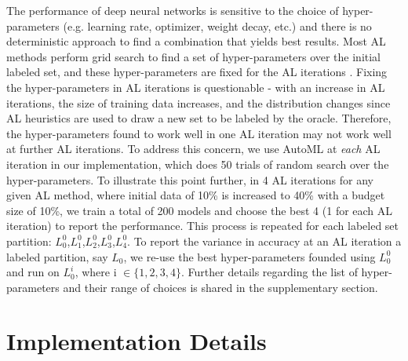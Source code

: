 \documentclass[10pt,twocolumn,letterpaper]{article}
\begin{document}
The performance of deep neural networks is sensitive to the choice of hyper-parameters (e.g. learning rate, optimizer, weight decay, etc.) and there is no deterministic approach to find a combination that yields best results. Most AL methods perform grid search to find a set of hyper-parameters over the initial labeled set, and these hyper-parameters are fixed for the AL iterations \cite{coreset_sener2018active,VAAL_sinha2019variational}.
Fixing the hyper-parameters in AL iterations is questionable - with an increase in AL iterations, the size of training data increases, and the distribution changes since AL heuristics are used to draw a new set to be labeled by the oracle. Therefore, the hyper-parameters found to work well in one AL iteration may not work well at further AL iterations. To address this concern, we use AutoML at \textit{each} AL iteration in our implementation, which does 50 trials of random search over the hyper-parameters. To illustrate this point further, in 4 AL iterations for any given AL method, where initial data of 10\% is increased to 40\% with a budget size of 10\%, we train a total of 200 models and choose the best 4 (1 for each AL iteration) to report the performance. This process is repeated for each labeled set 
partition: $L_0^0$,$L_1^0$,$L_2^0$,$L_3^0$,$L_4^0$. To report the variance in accuracy at an AL iteration a labeled partition, say $L_0$,  we re-use the best hyper-parameters founded using $L_0^0$ and run on $L_0^i$, where i $\in \{ 1,2,3,4 \}$. Further details regarding the list of hyper-parameters and their range of choices is shared in the supplementary section.










\section{Implementation Details}
\end{document}
